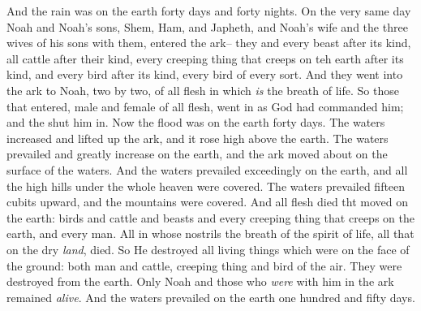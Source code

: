 \bverse And the rain was on the earth forty days and forty nights.
\bverse On the very same day Noah and Noah's sons, Shem, Ham, and Japheth, and Noah's wife and the three wives of his sons with them, entered the ark--
\bverse they and every beast after its kind, all cattle after their kind, every creeping thing that creeps on teh earth after its kind, and every bird after its kind, every bird of every sort.
\bverse And they went into the ark to Noah, two by two, of all flesh in which \textit{is} the breath of life.
\bverse So those that entered, male and female of all flesh, went in as God had commanded him; and the \lord shut him in.
\bverse Now the flood was on the earth forty days. The waters increased and lifted up the ark, and it rose high above the earth.
\bverse The waters prevailed and greatly increase on the earth, and the ark moved about on the surface of the waters.
\bverse And the waters prevailed exceedingly on the earth, and all the high hills under the whole heaven were covered.
\bverse The waters prevailed fifteen cubits upward, and the mountains were covered.
\bverse And all flesh died tht moved on the earth: birds and cattle and beasts and every creeping thing that creeps on the earth, and every man.
\bverse All in whose nostrils \was the breath of the spirit of life, all that \was on the dry \textit{land}, died.
\bverse So He destroyed all living things which were on the face of the ground: both man and cattle, creeping thing and bird of the air. They were destroyed from the earth. Only Noah and those who \textit{were} with him in the ark remained \textit{alive}.
\bverse And the waters prevailed on the earth one hundred and fifty days.
